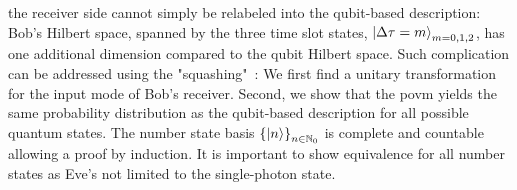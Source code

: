 the receiver side cannot simply be relabeled into the qubit-based description:
Bob's Hilbert space, spanned by the three time slot states, $\ket{\Delta\tau=m}_{m=0,1,2}$, has one additional dimension compared to the qubit Hilbert space.
Such complication can be addressed using the "squashing"~\cite{Beaudry2008,Gittsovich2014}:
We first find a unitary transformation for the input mode of Bob's receiver.
Second, we show that the \gls{povm} yields the same probability distribution as the qubit-based description for all possible quantum states.
The number state basis $\left\{\ket{n}\right\}_{n\in\mathbb{N}_0}$ is complete and countable allowing a proof by induction.
It is important to show equivalence for all number states as Eve's not limited to the single-photon state.